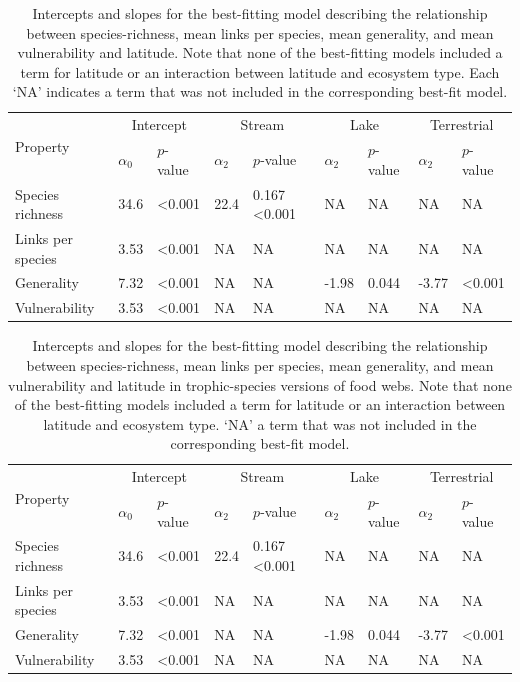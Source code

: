 \documentclass[12pt]{article}
\begin{document}
\begin{table}[!h]
\caption{Intercepts and slopes for the best-fitting model describing the relationship between species-richness, mean links per species, mean generality, and mean vulnerability and latitude. Note that none
of the best-fitting models included a term for latitude or an interaction between latitude and ecosystem type. Each `NA' indicates a term that was not included in the corresponding best-fit model.}
\label{Latlms}
\begin{tabular}{l | l l  l l  l l  l l}

\hline
\multirow{2}{*}{Property} & \multicolumn{2}{|c}{Intercept} & \multicolumn{2}{|c}{Stream} & \multicolumn{2}{|c}{Lake} & \multicolumn{2}{|c}{Terrestrial}\\
& $\alpha_{0}$ & $p$-value & $\alpha_{2}$ & $p$-value & $\alpha_{2}$ & $p$-value & $\alpha_{2}$ &$p$-value\\
\hline
Species richness  & 34.6 & \textless0.001 & 22.4 & 0.167 \textless0.001 & NA & NA & NA & NA \\
Links per species & 3.53 & \textless0.001 & NA & NA & NA & NA & NA & NA \\
Generality        & 7.32 & \textless0.001 & NA & NA & -1.98 & 0.044 & -3.77 & \textless0.001 \\
Vulnerability     & 3.53 & \textless0.001 & NA & NA & NA & NA & NA & NA \\
\hline
\end{tabular}
\end{table}

\begin{table}[!h]
\caption{Intercepts and slopes for the best-fitting model describing the relationship between species-richness, mean links per species, mean generality, and mean vulnerability and latitude in trophic-species versions of food webs. Note that none
of the best-fitting models included a term for latitude or an interaction between latitude and ecosystem type. `NA' a term that was not included in the corresponding best-fit model.}
\label{Latlms}
\begin{tabular}{l | l l  l l  l l  l l}

\hline
\multirow{2}{*}{Property} & \multicolumn{2}{|c}{Intercept} & \multicolumn{2}{|c}{Stream} & \multicolumn{2}{|c}{Lake} & \multicolumn{2}{|c}{Terrestrial}\\
& $\alpha_{0}$ & $p$-value & $\alpha_{2}$ & $p$-value & $\alpha_{2}$ & $p$-value & $\alpha_{2}$ &$p$-value\\
\hline
Species richness  & 34.6 & \textless0.001 & 22.4 & 0.167 \textless0.001 & NA & NA & NA & NA \\
Links per species & 3.53 & \textless0.001 & NA & NA & NA & NA & NA & NA \\
Generality        & 7.32 & \textless0.001 & NA & NA & -1.98 & 0.044 & -3.77 & \textless0.001 \\
Vulnerability     & 3.53 & \textless0.001 & NA & NA & NA & NA & NA & NA \\
\hline
\end{tabular}
\end{table}
\end{document}
